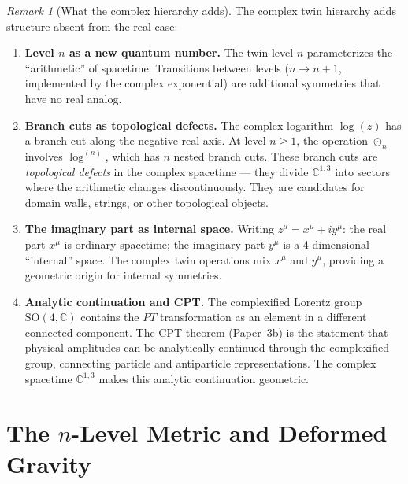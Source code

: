 \documentclass[12pt]{article}
\theoremstyle{plain}
\theoremstyle{definition}
\theoremstyle{remark}
\newtheorem{remark}[theorem]{Remark}
\newcommand{\SO}{\mathrm{SO}}
\newcommand{\CC}{\mathbb{C}}
\begin{document}
\begin{remark}[What the complex hierarchy adds]
The complex twin hierarchy adds structure absent from the real case:

\begin{enumerate}[label=(\roman*)]
    \item \textbf{Level $n$ as a new quantum number.} The twin level $n$ parameterizes the ``arithmetic'' of spacetime. Transitions between levels ($n \to n+1$, implemented by the complex exponential) are additional symmetries that have no real analog.
    
    \item \textbf{Branch cuts as topological defects.} The complex logarithm $\log(z)$ has a branch cut along the negative real axis. At level $n \geq 1$, the operation $\odot_n$ involves $\log^{(n)}$, which has $n$ nested branch cuts. These branch cuts are \emph{topological defects} in the complex spacetime --- they divide $\CC^{1,3}$ into sectors where the arithmetic changes discontinuously. They are candidates for domain walls, strings, or other topological objects.
    
    \item \textbf{The imaginary part as internal space.} Writing $z^\mu = x^\mu + iy^\mu$: the real part $x^\mu$ is ordinary spacetime; the imaginary part $y^\mu$ is a 4-dimensional ``internal'' space. The complex twin operations mix $x^\mu$ and $y^\mu$, providing a geometric origin for internal symmetries.
    
    \item \textbf{Analytic continuation and CPT.} The complexified Lorentz group $\SO(4, \CC)$ contains the $PT$ transformation as an element in a different connected component. The CPT theorem (Paper~3b) is the statement that physical amplitudes can be analytically continued through the complexified group, connecting particle and antiparticle representations. The complex spacetime $\CC^{1,3}$ makes this analytic continuation geometric.
\end{enumerate}
\end{remark}


\section{The $n$-Level Metric and Deformed Gravity}
\label{sec:n-metric}
\end{document}
